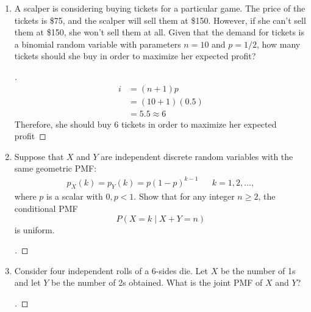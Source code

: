 \documentclass[paper=usletter, fontsize=12pt]{article}
\begin{document}
\begin{enumerate}[label=\textbf{\arabic*}.]
\begin{enumerate}[label=(\alph*)]
        \end{enumerate}

        \item
        A scalper is considering buying tickets for a particular game. The
        price of the tickets is \$75, and the scalper will sell them at \$150.
        However, if she can't sell them at \$150, she won't sell them at all.
        Given that the demand for tickets is a binomial random variable with
        parameters $n=10$ and $p=1/2$, how many tickets should she buy in order
        to maximize her expected profit?
        \begin{proof}[\unskip\nopunct]
            \begin{align*}
                i & = (n+1)p \\
                & = (10 + 1)(0.5) \\
                & = 5.5 \approx 6
            \end{align*}
            Therefore, she should buy 6 tickets in order to maximize her
            expected profit \qedhere
        \end{proof}
        \vspace{0.2in}

        \item
        Suppose that $X$ and $Y$ are independent discrete random variables with
        the same geometric PMF:
        \begin{align*}
            p_X(k)=p_Y(k)=p(1-p)^{k-1}&& k=1,2,\ldots,
        \end{align*}
        where $p$ is a scalar with $0,p<1$. Show that for any integer $n \ge
        2$, the conditional PMF
        \begin{equation*}
            P(X=k \mid X+Y=n)
        \end{equation*}
        is uniform.
        \begin{proof}[\unskip\nopunct]
        \end{proof}
        \vspace{0.2in}

        \item
        Consider four independent rolls of a 6-sides die. Let $X$ be the number
        of 1s and let $Y$ be the number of 2s obtained. What is the joint PMF
        of $X$ and $Y$?
        \begin{proof}[\unskip\nopunct]
        \end{proof}
        \vspace{0.2in}


\end{enumerate}
\end{document}

